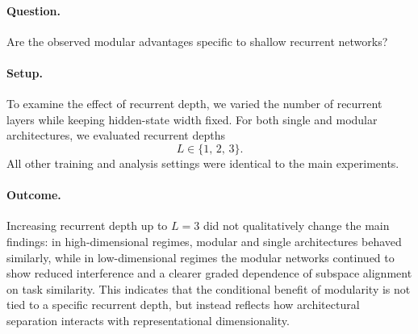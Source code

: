 \documentclass{article}
\theoremstyle{plain}
\theoremstyle{definition}
\theoremstyle{remark}
\begin{document}
\paragraph{Question.}
Are the observed modular advantages specific to shallow recurrent networks?

\paragraph{Setup.}
To examine the effect of recurrent depth, we varied the number of recurrent layers while keeping hidden-state width fixed.
For both single and modular architectures, we evaluated recurrent depths
\[
L \in \{1,\, 2,\, 3\}.
\]
All other training and analysis settings were identical to the main experiments.

\paragraph{Outcome.}
Increasing recurrent depth up to $L=3$ did not qualitatively change the main findings: in high-dimensional regimes, modular and single architectures behaved similarly, while in low-dimensional regimes the modular networks continued to show reduced interference and a clearer graded dependence of subspace alignment on task similarity. This indicates that the conditional benefit of modularity is not tied to a specific recurrent depth, but instead reflects how architectural separation interacts with representational dimensionality.
\end{document}

